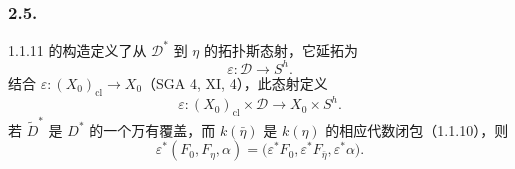 \subsubsection*{2.5.}
1.1.11 的构造定义了从 $\mathcal D^*$ 到 $\eta$ 的拓扑斯态射，它延拓为
\[
\varepsilon:\mathcal D\longrightarrow S^h.
\]
结合 $\varepsilon:(X_0)_{\mathrm{cl}}\longrightarrow X_0$（SGA 4, XI, 4），此态射定义
\[
\varepsilon:(X_0)_{\mathrm{cl}}\times\mathcal D
\longrightarrow X_0\times S^h.
\]
若 $\widetilde D^*$ 是 $D^*$ 的一个万有覆盖，而 $k(\bar\eta)$ 是 $k(\eta)$ 的相应代数闭包（1.1.10），则
\[
\varepsilon^*(F_0,F_\eta,\alpha)
=\bigl(\varepsilon^*F_0,\varepsilon^*F_{\bar\eta},
\varepsilon^*\alpha\bigr).
\]


